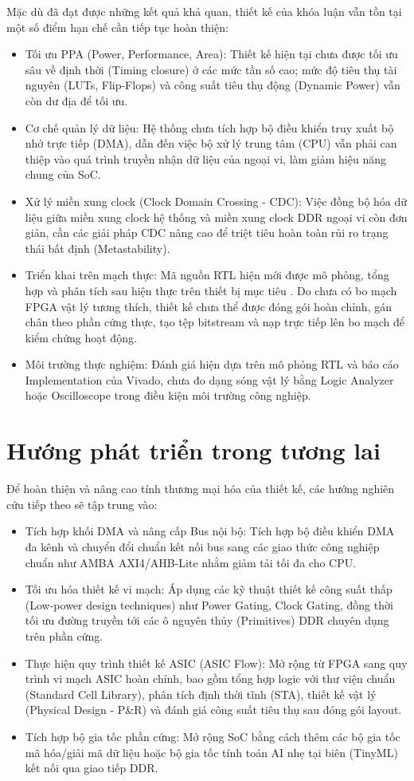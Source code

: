 Mặc dù đã đạt được những kết quả khả quan, thiết kế của khóa luận vẫn tồn tại một số điểm hạn chế cần tiếp tục hoàn thiện:
\begin{itemize}
    \item Tối ưu PPA (Power, Performance, Area): Thiết kế hiện tại chưa được tối ưu sâu về định thời (Timing closure) ở các mức tần số cao; mức độ tiêu thụ tài nguyên (LUTs, Flip-Flops) và công suất tiêu thụ động (Dynamic Power) vẫn còn dư địa để tối ưu.
    \item Cơ chế quản lý dữ liệu: Hệ thống chưa tích hợp bộ điều khiển truy xuất bộ nhớ trực tiếp (DMA), dẫn đến việc bộ xử lý trung tâm (CPU) vẫn phải can thiệp vào quá trình truyền nhận dữ liệu của ngoại vi, làm giảm hiệu năng chung của SoC.
    \item Xử lý miền xung clock (Clock Domain Crossing - CDC): Việc đồng bộ hóa dữ liệu giữa miền xung clock hệ thống và miền xung clock DDR ngoại vi còn đơn giản, cần các giải pháp CDC nâng cao để triệt tiêu hoàn toàn rủi ro trạng thái bất định (Metastability).
    \item Triển khai trên mạch thực: Mã nguồn RTL hiện mới được mô phỏng, tổng hợp và phân tích sau hiện thực trên thiết bị mục tiêu . Do chưa có bo mạch FPGA vật lý tương thích, thiết kế chưa thể được đóng gói hoàn chỉnh, gán chân theo phần cứng thực, tạo tệp bitstream và nạp trực tiếp lên bo mạch để kiểm chứng hoạt động.
    \item Môi trường thực nghiệm: Đánh giá hiện dựa trên mô phỏng RTL và báo cáo Implementation của Vivado, chưa đo dạng sóng vật lý bằng Logic Analyzer hoặc Oscilloscope trong điều kiện môi trường công nghiệp.
\end{itemize}

\section{Hướng phát triển trong tương lai}

Để hoàn thiện và nâng cao tính thương mại hóa của thiết kế, các hướng nghiên cứu tiếp theo sẽ tập trung vào:
\begin{itemize}
    \item Tích hợp khối DMA và nâng cấp Bus nội bộ: Tích hợp bộ điều khiển DMA đa kênh và chuyển đổi chuẩn kết nối bus sang các giao thức công nghiệp chuẩn như AMBA AXI4/AHB-Lite nhằm giảm tải tối đa cho CPU.
    \item Tối ưu hóa thiết kế vi mạch: Áp dụng các kỹ thuật thiết kế công suất thấp (Low-power design techniques) như Power Gating, Clock Gating, đồng thời tối ưu đường truyền tới các ô nguyên thủy (Primitives) DDR chuyên dụng trên phần cứng.
    \item Thực hiện quy trình thiết kế ASIC (ASIC Flow): Mở rộng từ FPGA sang quy trình vi mạch ASIC hoàn chỉnh, bao gồm tổng hợp logic với thư viện chuẩn (Standard Cell Library), phân tích định thời tĩnh (STA), thiết kế vật lý (Physical Design - P\&R) và đánh giá công suất tiêu thụ sau đóng gói layout.
    \item Tích hợp bộ gia tốc phần cứng: Mở rộng SoC bằng cách thêm các bộ gia tốc mã hóa/giải mã dữ liệu hoặc bộ gia tốc tính toán AI nhẹ tại biên (TinyML) kết nối qua giao tiếp DDR.
\end{itemize}
